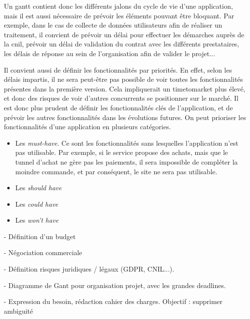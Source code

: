 
Un \gls{gantt} contient donc les différents jalons du cycle de vie d'une application, mais il est aussi nécessaire de prévoir les éléments pouvant être bloquant. Par exemple, dans le cas de collecte de données utilisateurs afin de réaliser un traitement, il convient de prévoir un délai pour effectuer les démarches auprès de la \gls{cnil}, prévoir un délai de validation du contrat avec les différents prestataires, les délais de réponse au sein de l'organisation afin de valider le projet...

Il convient aussi de définir les fonctionnalités par priorités. En effet, selon les délais impartis, il ne sera peut-être pas possible de voir toutes les fonctionnalités présentes dans la première version. Cela impliquerait un \gls{timetomarket} plus élevé, et donc des risques de voir d'autres concurrents se positionner sur le marché. Il est donc plus prudent de définir les fonctionnalités clés de l'application, et de prévoir les autres fonctionnalités dans les évolutions futures. On peut prioriser les fonctionnalités d'une application en plusieurs catégories.

\begin{itemize}
	\item Les \emph{must-have}. Ce sont les fonctionnalités sans lesquelles l'application n'est pas utilisable. Par exemple, si le service propose des achats, mais que le tunnel d'achat ne gère pas les paiements, il sera impossible de compléter la moindre commande, et par conséquent, le site ne sera pas utilisable.
	\item Les \emph{should have}
	\item Les \emph{could have}
	\item Les \emph{won't have}
\end{itemize}



- Définition d'un budget

- Négociation commerciale

- Définition risques juridiques / légaux (GDPR, CNIL...).

- Diagramme de Gant pour organisation projet, avec les grandes deadlines.

- Expression du besoin, rédaction cahier des charges. Objectif : supprimer ambiguité

